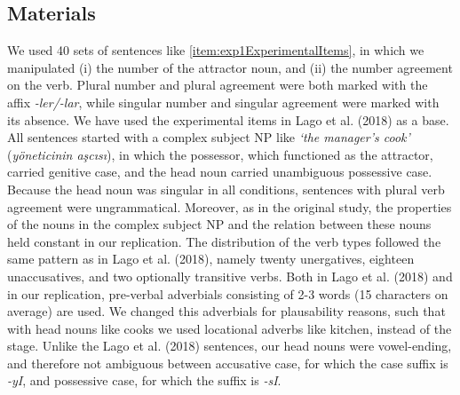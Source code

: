 \documentclass[
  english,
  doc,floatsintext]{apa6}
\begin{document}
\hypertarget{materials}{%
\subsection{Materials}\label{materials}}

We used 40 sets of sentences like \ref{item:exp1ExperimentalItems}, in which we manipulated
(i) the number of the attractor noun, and
(ii) the number agreement on the verb.
Plural number and plural agreement were both marked with the affix \textit{-ler/-lar}, while singular number and singular agreement were marked with its absence.
We have used the experimental items in Lago et al. (2018) as a base.
All sentences started with a complex subject NP like \textit{`the manager's cook'} (\textit{yöneticinin aşcısı}), in which the possessor, which functioned as the attractor, carried genitive case, and the head noun carried unambiguous possessive case.
Because the head noun was singular in all conditions, sentences with plural verb agreement were ungrammatical.
Moreover, as in the original study, the properties of the nouns in the complex subject NP and the relation between these nouns held constant in our replication.
The distribution of the verb types followed the same pattern as in Lago et al. (2018), namely twenty unergatives, eighteen unaccusatives, and two optionally transitive verbs.
Both in Lago et al. (2018) and in our replication, pre-verbal adverbials consisting of 2-3 words (15 characters on average) are used. We changed this adverbials for plausability reasons, such that with head nouns like cooks we used locational adverbs like kitchen, instead of the stage.
Unlike the Lago et al. (2018) sentences, our head nouns were vowel-ending, and therefore not ambiguous between accusative case, for which the case suffix is \textit{-yI}, and possessive case, for which the suffix is \textit{-sI}.
\end{document}
